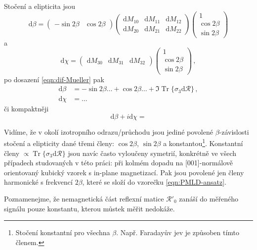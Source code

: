 Stočení a elipticita jsou
\begin{equation}
    \textrm{d}\beta = \begin{pmatrix} -\sin2\beta&\cos2\beta \end{pmatrix} \begin{pmatrix} \textrm{d}M_{10}&\textrm{d}M_{11}&\textrm{d}M_{12}\\\textrm{d}M_{20}&\textrm{d}M_{21}&\textrm{d}M_{22} \end{pmatrix} \begin{pmatrix} 1\\\cos2\beta\\\sin2\beta \end{pmatrix}
\end{equation}
a
\begin{equation}
    \textrm{d}\chi = \begin{pmatrix} \textrm{d}M_{30}&\textrm{d}M_{31}&\textrm{d}M_{32} \end{pmatrix} \begin{pmatrix} 1\\\cos2\beta\\\sin2\beta \end{pmatrix} \,,
\end{equation}
po dosazení \eqref{eqn:dif-Mueller} pak 
\begin{align}
    \textrm{d}\beta &= -\sin2\beta \ldots + \cos2\beta \ldots + \Im \operatorname{Tr}\lbrace \sigma_3 \textrm{d}\mathcal{R} \rbrace\,,\label{eqn:dbeta-stokes}\\
    \textrm{d}\chi &= \ldots
\end{align}
či kompaktněji
\begin{equation}
    \textrm{d}\beta + i \textrm{d}\chi = 
\end{equation}

Vidíme, že v okolí izotropního odrazu/průchodu jsou jediné povolené $\beta$-závislosti stočení a elipticity dané třemi členy: $\cos2\beta$, $\sin2\beta$ a konstantou\footnote{Stočení konstantní pro všechna $\beta$. Např. Faradayův jev je způsoben tímto členem.}.
Konstantní členy $\propto \operatorname{Tr}\lbrace \sigma_3 \textrm{d}\mathcal{R} \rbrace$ jsou navíc často vyloučeny symetrií, konkrétně ve všech případech studovaných v této práci: při kolmém dopadu na [001]-normálově orientovaný kubický vzorek s in-plane magnetizací.
Pak jsou povolené jen členy harmonické s frekvencí $2\beta$, které se složí do vzorečku \eqref{eqn:PMLD-ansatz}.

Poznamenejme, že nemagnetická část reflexní matice $\mathcal{R}'_0$ zanáší do měřeného signálu pouze konstantu, kterou můstek měřit nedokáže.

